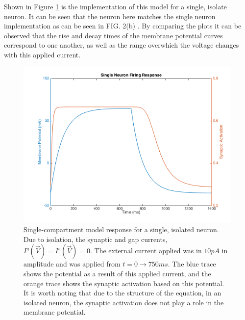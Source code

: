 \documentclass[11pt]{article} %
\begin{document}
Shown in Figure \ref{fig:f1} is the implementation of this model for a single, isolate neuron. It can be seen that the neuron here matches the single neuron implementation as can be seen in FIG. 2(b) \cite{Kunert2014}. By comparing the plots it can be observed that the rise and decay times of the membrane potential curves correspond to one another, as well as the range overwhich the voltage changes with this applied current.
\begin{figure}[h!]
\begin{center}
\includegraphics[scale=0.4]{motn_fig1.png} \caption[h1]{Single-compartment model response for a single, isolated neuron. Due to isolation, the synaptic and gap currents, $I^g(\vec{V}) = I^s(\vec{V}) = 0$. The external current applied was in $10 pA$ in amplitude and was applied from $t=0\to750 ms$. The blue trace shows the potential as a result of this applied current, and the orange trace shows the synaptic activation based on this potential. It is worth noting that due to the structure of the equation, in an isolated neuron, the synaptic activation does not play a role in the membrane potential.} \label{fig:f1} \end{center}
\end{figure}  

\end{document}
